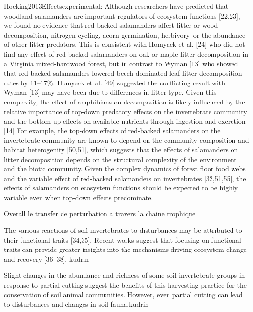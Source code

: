 Hocking2013Effectsexperimental:
Although researchers have predicted that woodland salamanders are important regulators of ecosystem functions [22,23], we found no evidence that red-backed salamanders affect litter or wood decomposition, 
nitrogen cycling, acorn germination, herbivory, or the abundance of other litter predators.
This is consistent with Homyack et al. [24] who did not find any effect of red-backed salamanders on oak or maple litter decomposition in a Virginia mixed-hardwood forest, 
but in contrast to Wyman [13] who showed that red-backed salamanders lowered beech-dominated leaf litter decomposition rates by 11–17\%. 
Homyack et al. [49] suggested the conflicting result with Wyman [13] may have been due to differences in litter type.
Given this complexity, the effect of amphibians on decomposition is likely influenced by the relative importance of top-down predatory effects on the invertebrate community and the bottom-up effects 
on available nutrients through ingestion and excretion [14]
For example, the top-down effects of red-backed salamanders on the invertebrate community are known to depend on the community composition and habitat heterogenity [50,51], which suggests that the effects of salamanders on litter decomposition depends on the structural complexity of the environment and the biotic community.
Given the complex dynamics of forest floor food webs and the variable effect of red-backed salamanders on invertebrates [32,51,55], the effects of salamanders on ecosystem functions should be expected to be highly variable even when top-down effects predominate.



Overall le transfer de perturbation a travers la chaine trophique

The various reactions of soil invertebrates to disturbances may be attributed to their functional traits [34,35]. Recent works suggest that focusing on functional traits can provide greater insights into the mechanisms driving ecosystem change and recovery [36–38]. kudrin

Slight changes in the abundance and richness of some soil invertebrate groups in response to partial cutting suggest the benefits of this harvesting practice for the conservation of soil animal communities. However, even partial cutting can lead to disturbances and changes in soil fauna.kudrin



